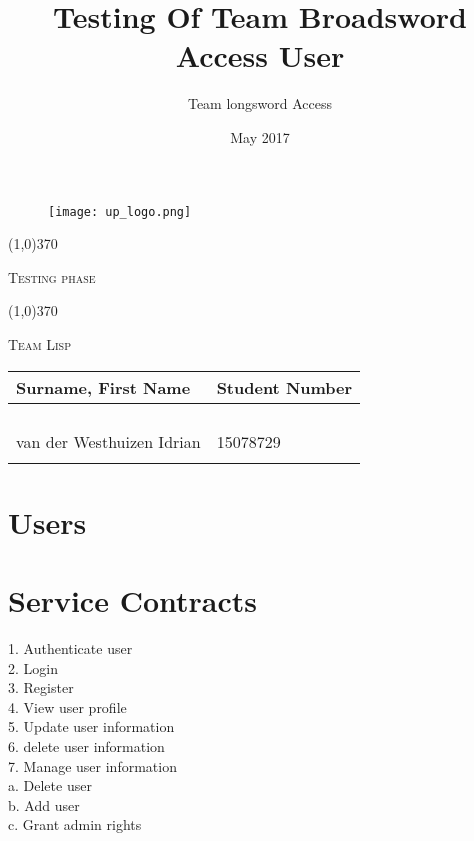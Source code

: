 \documentclass[english]{article}
\begin{document}
\title{Testing Of Team Broadsword Access User }
\author{Team longsword Access }
\date{May 2017}
\maketitle

	\begin{figure}
		\texttt{[image: up\_logo.png]}
	\end{figure}
	
	\begin{center}
	 \line(1,0){370}
	\\[0.2cm]
    	{\scshape\Large Testing phase  \par}
	\vspace{0.1cm}
	\line(1,0){370}
	\\[0.8cm]
	
	 {\scshape\Large Team Lisp \par}
	\vspace{0.9cm}
	
	\begin{tabu} to \textwidth { X[l] X[l]}
		\hline
		\textbf{Surname, First Name  }	& \textbf{Student Number}	\\ \hline \hline
		   &	\\ \hline
		  &	\\ \hline
		  &	\\ \hline
	    	 &	\\ \hline
		van der Westhuizen Idrian&15078729\\ \hline
		 &	\\ \hline
		\hline
	\end{tabu}
	
	\end{center}

	\newpage
	\tableofcontents

	\newpage

\section{Users}

\section{Service Contracts}
1.	Authenticate user\\
2.	Login\\
3.	Register\\
4.	View user profile\\
5.	Update user information\\
6.	delete user information\\
7.	Manage user information\\
    a.	Delete user\\
    b.	Add user\\
    c.	Grant admin rights\\
\end{document}
